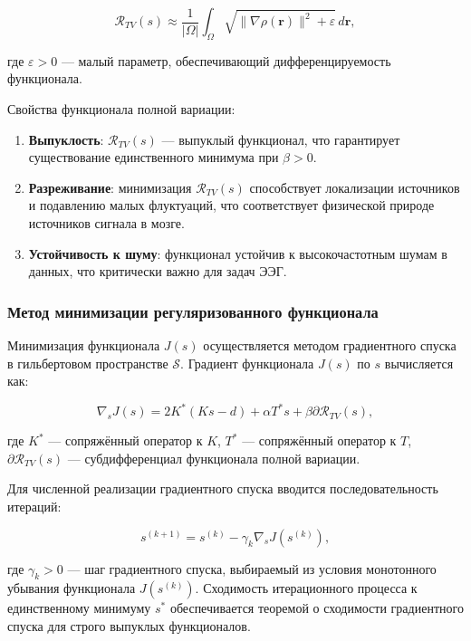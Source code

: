 \documentclass[sn-mathphys-num]{bst/sn-jnl}
\theoremstyle{thmstylethree}
\theoremstyle{thmstyletwo}
\theoremstyle{thmstyleone}
\begin{document}
\begin{equation}
    \mathcal{R}_{TV}(s) \approx \frac{1}{|\Omega|} \int_{\Omega} \sqrt{\|\nabla \rho(\mathbf{r})\|^2 + \varepsilon} \, d\mathbf{r},
\end{equation}

где $\varepsilon > 0$ --- малый параметр, обеспечивающий дифференцируемость функционала.

Свойства функционала полной вариации:
\begin{enumerate}
    \item \textbf{Выпуклость}: $\mathcal{R}_{TV}(s)$ --- выпуклый функционал, что гарантирует существование единственного минимума при $\beta > 0$.
    \item \textbf{Разреживание}: минимизация $\mathcal{R}_{TV}(s)$ способствует локализации источников и подавлению малых флуктуаций, что соответствует физической природе источников сигнала в мозге.
    \item \textbf{Устойчивость к шуму}: функционал устойчив к высокочастотным шумам в данных, что критически важно для задач ЭЭГ.
\end{enumerate}

\subsubsection{Метод минимизации регуляризованного функционала}

Минимизация функционала $J(s)$ осуществляется методом градиентного спуска в гильбертовом пространстве $\mathcal{S}$. Градиент функционала $J(s)$ по $s$ вычисляется как:

\begin{equation}
    \nabla_s J(s) = 2K^*(Ks - d) + \alpha T^* s + \beta \partial \mathcal{R}_{TV}(s),
\end{equation}

где $K^*$ --- сопряжённый оператор к $K$, $T^*$ --- сопряжённый оператор к $T$, $\partial \mathcal{R}_{TV}(s)$ --- субдифференциал функционала полной вариации.

Для численной реализации градиентного спуска вводится последовательность итераций:

\begin{equation}
    s^{(k+1)} = s^{(k)} - \gamma_k \nabla_s J(s^{(k)}),
\end{equation}

где $\gamma_k > 0$ --- шаг градиентного спуска, выбираемый из условия монотонного убывания функционала $J(s^{(k)})$. 
Сходимость итерационного процесса к единственному минимуму $s^*$ обеспечивается теоремой о сходимости 
градиентного спуска для строго выпуклых функционалов.
\end{document}
